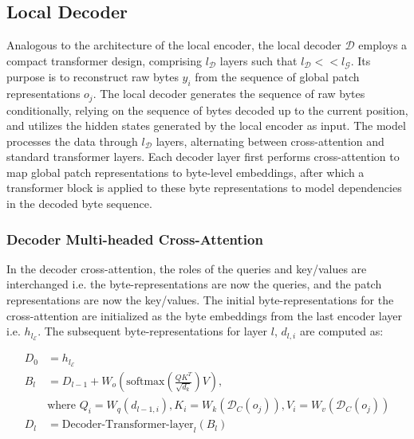 \subsection{Local Decoder} 

Analogous to the architecture of the local encoder, the local decoder $\mathcal{D}$ employs a compact transformer design, comprising $l_{\mathcal{D}}$ layers such that $l_{\mathcal{D}} << l_{\mathcal{G}}$. Its purpose is to reconstruct raw bytes $y_i$ from the sequence of global patch representations $o_j$. The local decoder generates the sequence of raw bytes conditionally, relying on the sequence of bytes decoded up to the current position, and utilizes the hidden states generated by the local encoder as input. The model processes the data through $l_{\mathcal{D}}$ layers, alternating between cross-attention and standard transformer layers. Each decoder layer first performs cross-attention to map global patch representations to byte-level embeddings, after which a transformer block is applied to these byte representations to model dependencies in the decoded byte sequence.

\subsubsection{Decoder Multi-headed Cross-Attention} 

In the decoder cross-attention, the roles of the queries and key/values are interchanged i.e. the byte-representations are now the queries, and the patch representations are now the key/values. The initial byte-representations for the cross-attention are initialized as the byte embeddings from the last encoder layer i.e. $h_{l_{\mathcal{E}}}$. The subsequent byte-representations for layer $l$, $d_{l,i}$ are computed as:

\begin{align}
D_0 &= h_{l_{\mathcal{E}}} \\
B_l &= D_{l-1} + W_o\left(\text{softmax}\left(\frac{QK^T}{\sqrt{d_k}}\right)V\right), \\
  &\text{where } Q_i = W_q(d_{l-1,i}), K_i = W_k(\mathcal{D}_C(o_j)), V_i = W_v(\mathcal{D}_C(o_j)) \\
  D_l &= \text{Decoder-Transformer-layer}_l(B_l)
\end{align}

